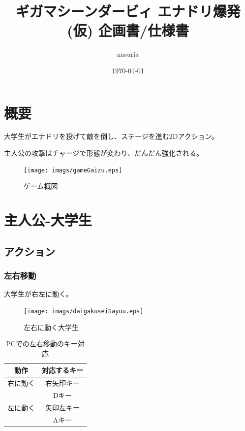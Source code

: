 \documentclass[12pt]{jsarticle}
\begin{document}
\title{
  ギガマシーンダービィ \linebreak{}
  エナドリ爆発 (仮) \linebreak{}
  企画書/仕様書
}
\author{nasuria}
\date{\today}
\maketitle
\newpage

\tableofcontents
\newpage


\section{概要}
大学生がエナドリを投げて敵を倒し、ステージを進む2Dアクション。

主人公の攻撃はチャージで形態が変わり、だんだん強化される。

\begin{figure}[htbp]
  \begin{center}
    \texttt{[image: imags/gameGaizu.eps]}
    \caption{ゲーム概図}
  \end{center}
\end{figure}

\newpage

\section{主人公-大学生}
\subsection{アクション}
\subsubsection{左右移動}

大学生が右左に動く。

\begin{figure}[htbp]
  \begin{center}
    \texttt{[image: imags/daigakuseiSayuu.eps]}
    \caption{左右に動く大学生}
  \end{center}
\end{figure}

\begin{table}[htbp]
  \centering
  \caption{PCでの左右移動のキー対応}
  \begin{tabular}{c|c}
    動作 & 対応するキー \\
    \hline
    右に動く & 右矢印キー \\
      & Dキー \\
    \hline
    左に動く & 矢印左キー \\
      & Aキー \\
  \end{tabular}
\end{table}
\end{document}
